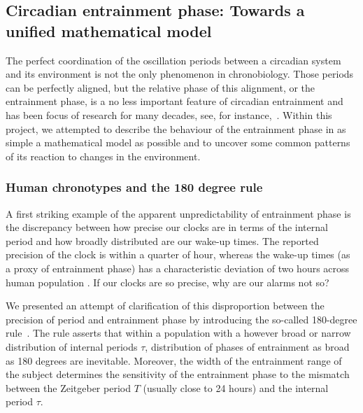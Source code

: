 \subsection{Circadian entrainment phase: Towards a unified mathematical
model}

The perfect coordination of the oscillation periods between a
circadian system and its environment is not the only phenomenon in
chronobiology. Those periods can be perfectly aligned, but the
relative phase of this alignment, or the entrainment phase, is a no
less important feature of circadian entrainment and has been focus of
research for many decades, see, for
instance,~\cite{pittendrigh1981circadian}. Within this project, we
attempted to describe the behaviour of the entrainment phase in as
simple a mathematical model as possible and to uncover some common
patterns of its reaction to changes in the environment.

\subsubsection{Human chronotypes and the 180 degree rule}
A first striking example of the apparent unpredictability of
entrainment phase is the discrepancy between how precise our clocks
are in terms of the internal period and how broadly distributed are
our wake-up times. The reported precision of the clock is within a
quarter of hour, whereas the wake-up times (as a proxy of entrainment
phase) has a characteristic deviation of two hours across human
population \cite{duffy2005entrainment}. If our clocks are so precise,
why are our alarms not so?

We presented an attempt of clarification of this disproportion between
the precision of period and entrainment phase by introducing the
so-called 180-degree rule~\cite{granada2013human}. The rule asserts
that within a population with a however broad or narrow distribution
of internal periods $\tau$, distribution of phases of entrainment as
broad as 180 degrees are inevitable. Moreover, the width of the
entrainment range of the subject determines the sensitivity of the
entrainment phase to the mismatch between the Zeitgeber period $T$
(usually close to 24 hours) and the internal period $\tau$.

